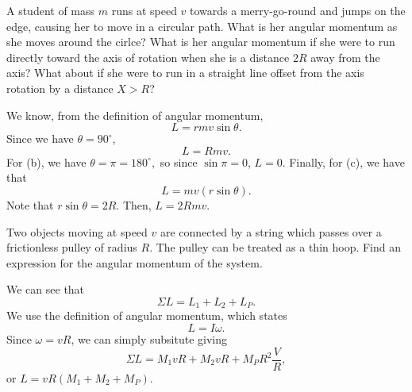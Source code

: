 \documentclass[11pt]{article}
\begin{document}
\begin{example}
	A student of mass $m$ runs at speed $v$ towards a merry-go-round and jumps on the edge, causing her to move in a circular path. What is her angular momentum as she moves around the cirlce? What is her angular momentum if she were to run directly toward the axis of rotation when she is a distance $2R$ away from the axis? What about if she were to run in a straight line offset from the axis rotation by a distance $X > R$?
\end{example}
\begin{solution}
	We know, from the definition of angular momentum,
	\[L = rmv\sin\theta.\]
	Since we have $\theta = 90^{\circ}$,
	\[L = \boxed{Rmv}.\]
	For (b), we have $\theta = \pi = 180^{\circ},$ so since $\sin\pi = 0$, $L = \boxed{0}$.  Finally, for (c), we have that \[L = mv(r\sin\theta).\]
	Note that $r\sin\theta = 2R.$ Then, $L = \boxed{2Rmv}$. 
\end{solution}

\begin{example}
	Two objects moving at speed $v$ are connected by a string which passes over a frictionless pulley of radius $R$. The pulley can be treated as a thin hoop. Find an expression for the angular momentum of the system.
\end{example}
\begin{solution}
	We can see that
	\[\Sigma L = L_1 + L_2 + L_P.\]
	We use the definition of angular momentum, which states
	\[L = I\omega.\]
	Since $\omega = vR$, we can simply subsitute giving
	\[\Sigma L = M_1vR + M_2vR + M_PR^2\frac{V}{R},\]
	or $L = vR(M_1+M_2+M_P)$.
\end{solution}
\end{document}

